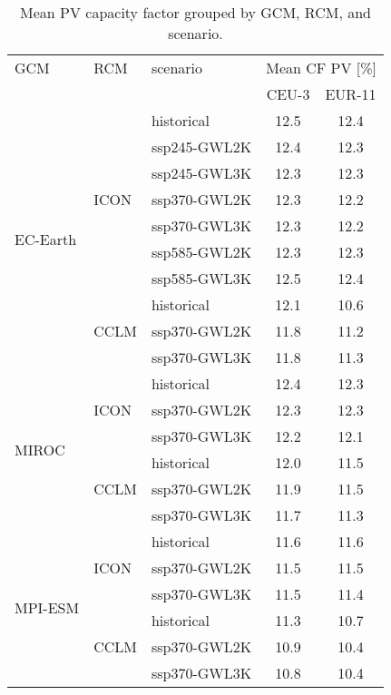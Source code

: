 \begin{table}[!htbp]
\centering
\caption{Mean PV capacity factor grouped by GCM, RCM, and scenario.}
\label{Table:CF_PV_changes}
\begin{tabular}{lll|cc}
\toprule
GCM & RCM & scenario & \multicolumn{2}{c}{Mean CF PV [\%]} \\
 & & & CEU-3 & EUR-11 \\
\midrule
\cmidrule(lr){1-5}
\multirow{10}{*}{EC-Earth} & \multirow{7}{*}{ICON} & historical & 12.5 & 12.4 \\
 &  & ssp245-GWL2K & 12.4 & 12.3 \\
 &  & ssp245-GWL3K & 12.3 & 12.3 \\
 &  & ssp370-GWL2K & 12.3 & 12.2 \\
 &  & ssp370-GWL3K & 12.3 & 12.2 \\
 &  & ssp585-GWL2K & 12.3 & 12.3 \\
 &  & ssp585-GWL3K & 12.5 & 12.4 \\
\cmidrule(lr){2-5}
 & \multirow{3}{*}{CCLM} & historical & 12.1 & 10.6 \\
 &  & ssp370-GWL2K & 11.8 & 11.2 \\
 &  & ssp370-GWL3K & 11.8 & 11.3 \\
\cmidrule(lr){2-5}
\multirow{6}{*}{MIROC} & \multirow{3}{*}{ICON} & historical & 12.4 & 12.3 \\
 &  & ssp370-GWL2K & 12.3 & 12.3 \\
 &  & ssp370-GWL3K & 12.2 & 12.1 \\
\cmidrule(lr){2-5}
 & \multirow{3}{*}{CCLM} & historical & 12.0 & 11.5 \\
 &  & ssp370-GWL2K & 11.9 & 11.5 \\
 &  & ssp370-GWL3K & 11.7 & 11.3 \\
\cmidrule(lr){2-5}
\multirow{6}{*}{MPI-ESM} & \multirow{3}{*}{ICON} & historical & 11.6 & 11.6 \\
 &  & ssp370-GWL2K & 11.5 & 11.5 \\
 &  & ssp370-GWL3K & 11.5 & 11.4 \\
\cmidrule(lr){2-5}
 & \multirow{3}{*}{CCLM} & historical & 11.3 & 10.7 \\
 &  & ssp370-GWL2K & 10.9 & 10.4 \\
 &  & ssp370-GWL3K & 10.8 & 10.4 \\
\bottomrule
\end{tabular}
\end{table}
